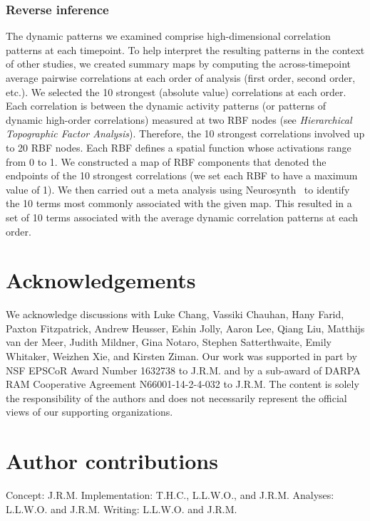 \documentclass[english]{article}
\begin{document}
\subsubsection*{Reverse inference}
The dynamic patterns we examined comprise high-dimensional correlation
patterns at each timepoint.  To help interpret the resulting patterns
in the context of other studies, we created summary maps by computing
the across-timepoint average pairwise correlations at each order of
analysis (first order, second order, etc.).  We selected the 10
strongest (absolute value) correlations at each order.  Each
correlation is between the dynamic activity patterns (or patterns of
dynamic high-order correlations) measured at two RBF nodes (see
\textit{Hierarchical Topographic Factor Analysis}).  Therefore, the 10
strongest correlations involved up to 20 RBF nodes.  Each RBF defines
a spatial function whose activations range from 0 to 1.  We
constructed a map of RBF components that denoted the endpoints of the
10 strongest correlations (we set each RBF to have a maximum value of
1).  We then carried out a meta analysis using
Neurosynth~\citep{RubiEtal17} to identify the 10 terms most commonly
associated with the given map.  This resulted in a set of 10 terms
associated with the average dynamic correlation patterns at each
order.


\section*{Acknowledgements}
We acknowledge discussions with Luke Chang, Vassiki Chauhan, Hany
Farid, Paxton Fitzpatrick, Andrew Heusser, Eshin Jolly, Aaron Lee,
Qiang Liu, Matthijs van der Meer, Judith Mildner, Gina Notaro, Stephen
Satterthwaite, Emily Whitaker, Weizhen Xie, and Kirsten Ziman. Our
work was supported in part by NSF EPSCoR Award Number 1632738 to
J.R.M. and by a sub-award of DARPA RAM Cooperative Agreement
N66001-14-2-4-032 to J.R.M.  The content is solely the responsibility
of the authors and does not necessarily represent the official views
of our supporting organizations.

\section*{Author contributions}
Concept: J.R.M.  Implementation: T.H.C., L.L.W.O., and J.R.M.
Analyses: L.L.W.O. and J.R.M.  Writing: L.L.W.O. and J.R.M.



\end{document}
